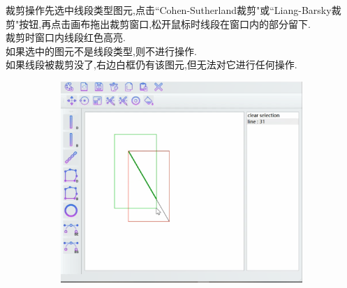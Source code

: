 \documentclass[a4paper,UTF8]{article}
\theoremstyle{definition}
\begin{document}
裁剪操作先选中线段类型图元,点击``Cohen-Sutherland裁剪"或``Liang-Barsky裁剪"按钮,再点击画布拖出裁剪窗口,松开鼠标时线段在窗口内的部分留下.\\
\indent 裁剪时窗口内线段红色高亮.\\
\indent 如果选中的图元不是线段类型,则不进行操作.\\
\indent 如果线段被裁剪没了,右边白框仍有该图元,但无法对它进行任何操作.
\begin{figure}[H]
	\includegraphics[width=5in,height=3in]{clip.png}
\end{figure}
\end{document}

